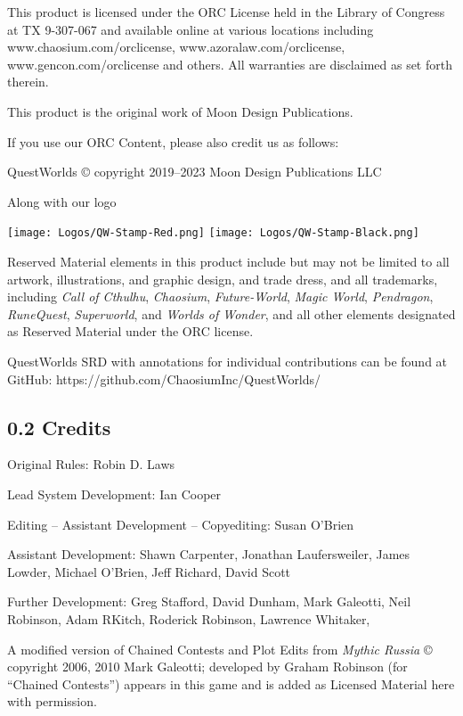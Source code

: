\documentclass[
  11pt,
]{article}
\begin{document}
This product is licensed under the ORC License held in the Library of
Congress at TX 9-307-067 and available online at various locations
including www.chaosium.com/orclicense, www.azoralaw.com/orclicense,
www.gencon.com/orclicense and others. All warranties are disclaimed as
set forth therein.

This product is the original work of Moon Design Publications.

If you use our ORC Content, please also credit us as follows:

QuestWorlds © copyright 2019--2023 Moon Design Publications LLC

Along with our logo

\texttt{[image: Logos/QW-Stamp-Red.png]}
\texttt{[image: Logos/QW-Stamp-Black.png]}

Reserved Material elements in this product include but may not be
limited to all artwork, illustrations, and graphic design, and trade
dress, and all trademarks, including \emph{Call of Cthulhu},
\emph{Chaosium}, \emph{Future-World}, \emph{Magic World},
\emph{Pendragon}, \emph{RuneQuest}, \emph{Superworld}, and \emph{Worlds
of Wonder}, and all other elements designated as Reserved Material under
the ORC license.

QuestWorlds SRD with annotations for individual contributions can be
found at GitHub: https://github.com/ChaosiumInc/QuestWorlds/

\hypertarget{credits}{%
\subsection{0.2 Credits}\label{credits}}

Original Rules: Robin D. Laws

Lead System Development: Ian Cooper

Editing -- Assistant Development -- Copyediting: Susan O'Brien

Assistant Development: Shawn Carpenter, Jonathan Laufersweiler, James
Lowder, Michael O'Brien, Jeff Richard, David Scott

Further Development: Greg Stafford, David Dunham, Mark Galeotti, Neil
Robinson, Adam RKitch, Roderick Robinson, Lawrence Whitaker,

A modified version of Chained Contests and Plot Edits from \emph{Mythic
Russia} © copyright 2006, 2010 Mark Galeotti; developed by Graham
Robinson (for ``Chained Contests'') appears in this game and is added as
Licensed Material here with permission.
\end{document}
